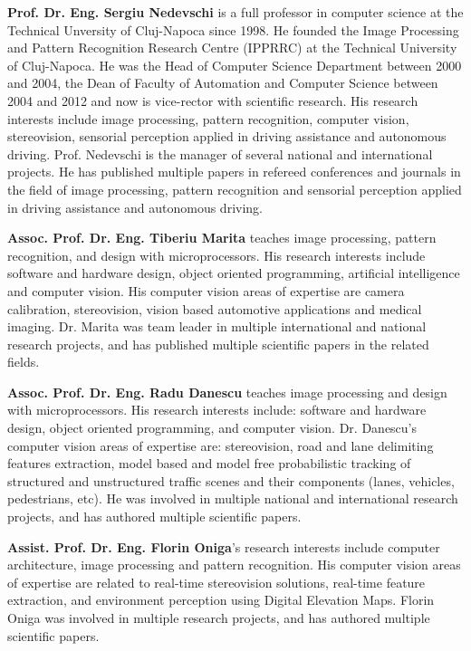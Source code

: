 \textbf{Prof. Dr. Eng. Sergiu Nedevschi} is a full professor in computer science at the Technical Unversity of Cluj-Napoca since 1998. He founded the Image Processing and Pattern Recognition Research Centre (IPPRRC) at the Technical University of Cluj-Napoca. He was the Head of Computer Science Department between 2000 and 2004, the Dean of Faculty of Automation and Computer Science between 2004 and 2012 and now is vice-rector with scientific research. His research interests include image processing, pattern recognition, computer vision, stereovision, sensorial perception applied in driving assistance and autonomous driving. Prof. Nedevschi is the manager of several national and international projects. He has published multiple papers in refereed conferences and journals in the field of image processing, pattern recognition and sensorial perception applied in driving assistance and autonomous driving.

\textbf{Assoc. Prof. Dr. Eng. Tiberiu Marita} teaches image processing, pattern recognition, and design with microprocessors. His research interests include software and hardware design, object oriented programming, artificial intelligence and computer vision. His computer vision areas of expertise are camera calibration, stereovision, vision based automotive applications and medical imaging. Dr. Marita was team leader in multiple international and national research projects, and has published multiple scientific papers in the related fields.

\textbf{Assoc. Prof. Dr. Eng. Radu Danescu} teaches image processing and design with microprocessors. His research interests include: software and hardware design, object oriented programming, and computer vision. Dr. Danescu's computer vision areas of expertise are: stereovision, road and lane delimiting features extraction, model based and model free probabilistic tracking of structured and unstructured traffic scenes and their components (lanes, vehicles, pedestrians, etc). He was involved in multiple national and international research projects, and has authored multiple scientific papers.

\textbf{Assist. Prof. Dr. Eng. Florin Oniga}'s research interests include computer architecture, image processing and pattern recognition. His computer vision areas of expertise are related to real-time stereovision solutions, real-time feature extraction, and environment perception using Digital Elevation Maps. Florin Oniga was involved in multiple research projects, and has authored multiple scientific papers.

